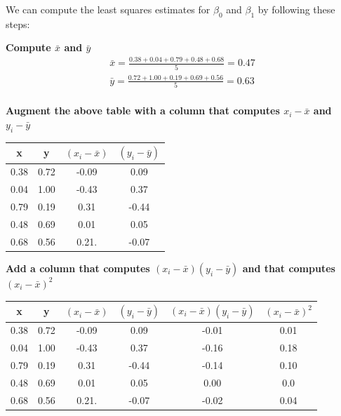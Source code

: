 We can compute the least squares estimates for $\beta_{0}$ and $\beta_{1}$ by following these steps:

\textbf{Compute $\bar{x}$ and $\bar{y}$}
\begin{align}
    \bar{x} = \frac{0.38 + 0.04 + 0.79 + 0.48 + 0.68}{5} = 0.47\\
    \bar{y} = \frac{0.72 + 1.00 + 0.19 + 0.69 + 0.56}{5} = 0.63\\
\end{align}

\clearpage
\textbf{Augment the above table with a column that computes $x_{i} - \bar{x}$ and $y_{i} - \bar{y}$}

\begin{table}[ht!]
    \centering
    \begin{tabular}{c|c|c|c }
        x & y & $(x_{i} - \bar{x})$ & $(y_{i} - \bar{y})$ \\
        \hline
        0.38 & 0.72 & -0.09 &  0.09\\
        0.04 & 1.00 & -0.43 &  0.37\\
        0.79 & 0.19 & 0.31  &  -0.44\\
        0.48 & 0.69 & 0.01  &  0.05 \\
        0.68 & 0.56 & 0.21. &  -0.07 \\
    \end{tabular}
\end{table}


\textbf{Add a column that computes  $(x_{i} - \bar{x})(y_{i} - \bar{y})$ and that computes $(x_{i} - \bar{x})^{2}$}

\begin{table}[ht!]
    \centering
    \begin{tabular}{c|c|c|c|c|c }
        x & y & $(x_{i} - \bar{x})$ & $(y_{i} - \bar{y})$ & $(x_{i} - \bar{x})(y_{i} - \bar{y})$ & $(x_{i} - \bar{x})^{2}$ \\
        \hline
        0.38 & 0.72 & -0.09 &  0.09  & -0.01 & 0.01 \\
        0.04 & 1.00 & -0.43 &  0.37  & -0.16 & 0.18 \\
        0.79 & 0.19 & 0.31  &  -0.44 & -0.14 & 0.10 \\
        0.48 & 0.69 & 0.01  &  0.05  & 0.00  & 0.0 \\
        0.68 & 0.56 & 0.21. &  -0.07 & -0.02 & 0.04 \\
    \end{tabular}
\end{table}

